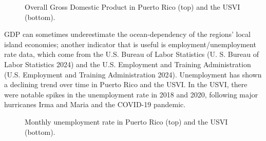 \documentclass[
  letterpaper,
  oneside,
  open=any]{scrbook}
\begin{document}
\begin{figure}


\caption{\label{fig-GDP}Overall Gross Domestic Product in Puerto Rico
(top) and the USVI (bottom).}

\end{figure}%

GDP can sometimes underestimate the ocean-dependency of the regions'
local island economies; another indicator that is useful is
employment/unemployment rate data, which come from the U.S. Bureau of
Labor Statistics (U. S. Bureau of Labor Statistics 2024) and the U.S.
Employment and Training Administration (U.S. Employment and Training
Administration 2024). Unemployment has shown a declining trend over time
in Puerto Rico and the USVI. In the USVI, there were notable spikes in
the unemployment rate in 2018 and 2020, following major hurricanes Irma
and Maria and the COVID-19 pandemic.

\begin{figure}


\caption{\label{fig-unemp}Monthly unemployment rate in Puerto Rico (top)
and the USVI (bottom).}

\end{figure}%
\end{document}
